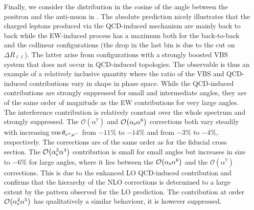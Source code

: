 \documentclass[a4article,11pt]{article}
\begin{document}
Finally, we consider the distribution in the cosine of the angle
between the positron and the anti-muon in
.  The absolute prediction
nicely illustrates that the charged leptons produced via the
QCD-induced mechanism are mainly back to back while the EW-induced
process has a maximum both for the back-to-back and the collinear
configurations (the drop in the last bin is due to the cut on $\Delta R_{\ell\ell}$).  
The latter arise from configurations with a
strongly boosted VBS system that does not occur in QCD-induced
topologies. The observable is thus an example of a relatively
inclusive quantity where the ratio of the VBS and QCD-induced contributions vary in shape in phase space.
While the  QCD-induced contributions  are strongly suppressed for
small and intermediate angles, they are of the same order of magnitude
as the EW contributions for very large angles.
The interference contribution is relatively
constant over the whole spectrum and strongly suppressed.  
{The $\mathcal{O}{\left(\alpha^{7}\right)}$ and
$\mathcal{O}{\left(\alpha_\text{s}\alpha^{6}\right)}$ corrections both
vary steadily with increasing $\cos\theta_{\text{e}^+\mu^-}$ 
from $-11\%$ to $-14\%$ and from $-3\%$ to $-4\%$, respectively.
The corrections are of the same order as for the fiducial cross section.
The $\mathcal{O}{\left(\alpha_\text{s}^{3}\alpha^{4}\right)}$ contribution is
small for small angles but increases in size to 
$-6\%$ 
for large
angles, where it lies between the
$\mathcal{O}{\left(\alpha_\text{s}\alpha^{6}\right)}$ and the
$\mathcal{O}{\left(\alpha^{7}\right)}$ corrections.}
This is due to the
enhanced LO QCD-induced contribution and
confirms that
the hierarchy of the NLO corrections is determined to a large extent
by the pattern observed for the LO prediction.
{The contribution
at order $\mathcal{O}{\left(\alpha_\text{s}^2\alpha^{5}\right)}$ has
qualitatively a similar behaviour, it is however suppressed.}
\end{document}
